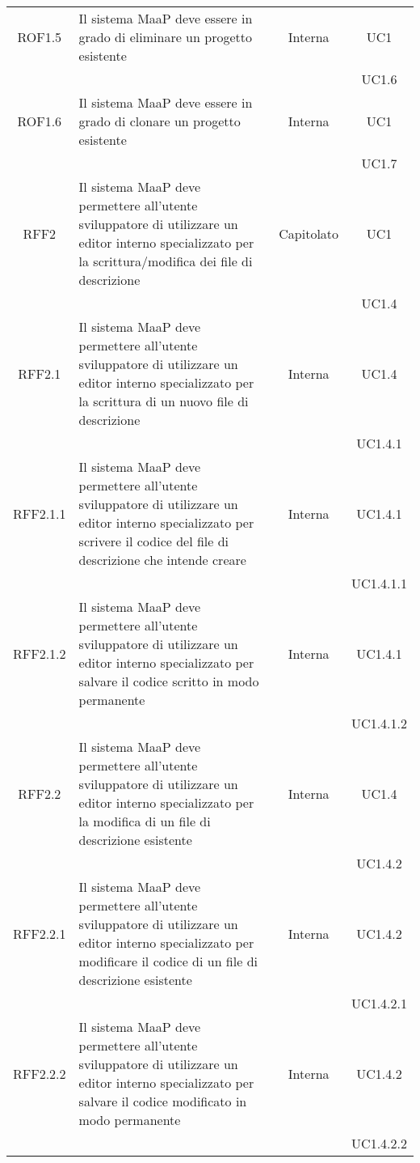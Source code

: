 \begin{longtable}{|c|p{6cm}|c|c|}
\midrule
ROF1.5
& Il sistema MaaP deve essere in grado di eliminare un progetto esistente
& Interna
& UC1\\
& & & UC1.6
\\

\midrule
ROF1.6
& Il sistema MaaP deve essere in grado di clonare un progetto esistente
& Interna
& UC1\\
& & & UC1.7
\\

\midrule
RFF2
& Il sistema MaaP deve permettere all'utente sviluppatore di utilizzare un editor interno specializzato per la scrittura/modifica dei file di descrizione
& Capitolato
& UC1\\
& & & UC1.4
\\

\midrule
RFF2.1
& Il sistema MaaP deve permettere all'utente sviluppatore di utilizzare un editor interno specializzato per la scrittura di un nuovo file di descrizione
& Interna
& UC1.4 \\
& & & UC1.4.1
\\

\midrule
RFF2.1.1
& Il sistema MaaP deve permettere all'utente sviluppatore di utilizzare un editor interno specializzato per scrivere il codice del file di descrizione che intende creare
& Interna
& UC1.4.1 \\
& & & UC1.4.1.1
\\

\midrule
RFF2.1.2
& Il sistema MaaP deve permettere all'utente sviluppatore di utilizzare un editor interno specializzato per salvare il codice scritto in modo permanente
& Interna
& UC1.4.1 \\
& & & UC1.4.1.2
\\

\midrule
RFF2.2
& Il sistema MaaP deve permettere all'utente sviluppatore di utilizzare un editor interno specializzato per la modifica di un file di descrizione esistente
& Interna
& UC1.4 \\
& & & UC1.4.2
\\

\midrule
RFF2.2.1
& Il sistema MaaP deve permettere all'utente sviluppatore di utilizzare un editor interno specializzato per modificare il codice di un file di descrizione esistente
& Interna
& UC1.4.2 \\
& & & UC1.4.2.1
\\

\midrule
RFF2.2.2
& Il sistema MaaP deve permettere all'utente sviluppatore di utilizzare un editor interno specializzato per salvare il codice modificato in modo permanente
& Interna
& UC1.4.2 \\
& & & UC1.4.2.2
\\


\end{longtable}
